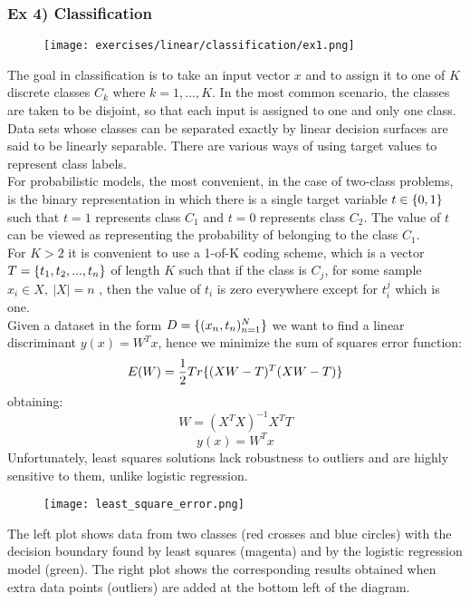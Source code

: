 \subsubsection{Ex 4) Classification}


\begin{figure}[H]
    \centering
    \texttt{[image: exercises/linear/classification/ex1.png]}
\end{figure}

The goal in classification is to take an input vector $x$ and to assign it to one of $K$  discrete classes $C_k$ where $k=1,...,K$. In the most common scenario, the classes are taken to be disjoint, so that each input is assigned to one and only one class. Data sets whose classes can be separated exactly by linear decision surfaces are said to be linearly separable. There are various ways of using target values to represent class labels.\\
For probabilistic models, the most convenient, in the case of two-class problems, is the binary representation in which there is a single target variable $t \in \lbrace{0,1}\rbrace$ such that $t=1$ represents class $C_1$  and $t=0$  represents class $C_2$. The value of $t$ can be viewed as representing the probability of belonging to the class $C_1$.\\
For $K>2$  it is convenient to use a 1-of-K coding scheme, which is a vector $T=\lbrace{t_1,t_2,...,t_n}\rbrace$ of length $K$ such that if the class is $C_j$, for some sample $x_i \in X,\ |X|=n$ , then the value of $t_i$ is zero everywhere except for $t_i^j$ which is one. \\
Given a dataset in the form $D=\lbrace{(x_n,t_n)^N_{n=1}}\rbrace$ we want to find a linear discriminant $y(x)=W^Tx$, hence we minimize the sum of squares error function:
\[E(W)=\frac{1}{2}Tr\lbrace{(XW-T)^T(XW-T)}\rbrace\]
obtaining:
\[W=(X^TX)^{-1}X^TT\]
\[y(x)=W^Tx\]
Unfortunately, least squares solutions lack robustness to outliers and are highly sensitive to them, unlike logistic regression.

\begin{figure}[H]
    \centering
    \texttt{[image: least\_square\_error.png]}
\end{figure}
The left plot shows data from two classes (red crosses and blue circles) with the decision boundary found by least squares (magenta) and by the logistic regression model (green). The right plot shows the corresponding results obtained when extra data points (outliers) are added at the bottom left of the diagram.

